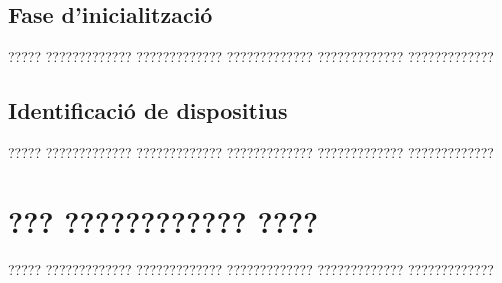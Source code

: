 \documentclass[12pt,spanish,listoffigures,listoftables]{tfgetsinf}
\begin{document}
\section{Fase d'inicialització}

????? ????????????? ????????????? ????????????? ????????????? ?????????????

\section{Identificació de dispositius}

????? ????????????? ????????????? ????????????? ????????????? ?????????????



\chapter{??? ???????????? ????}

????? ????????????? ????????????? ????????????? ????????????? ????????????? 



\end{document}
